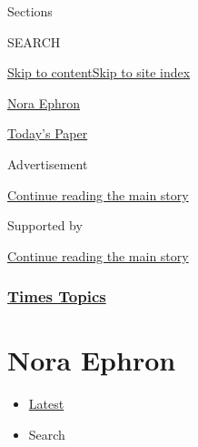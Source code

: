 Sections

SEARCH

\protect\hyperlink{site-content}{Skip to
content}\protect\hyperlink{site-index}{Skip to site index}

\href{https://www.nytimes.com/topic/person/nora-ephron}{Nora Ephron}

\href{https://myaccount.nytimes.com/auth/login?response_type=cookie\&client_id=vi}{}

\href{https://www.nytimes.com/section/todayspaper}{Today's Paper}

Advertisement

\protect\hyperlink{after-top}{Continue reading the main story}

Supported by

\protect\hyperlink{after-sponsor}{Continue reading the main story}

\hypertarget{times-topics}{%
\subsubsection{\texorpdfstring{\href{/index.html}{Times
Topics}}{Times Topics}}\label{times-topics}}

\hypertarget{nora-ephron}{%
\section{Nora Ephron}\label{nora-ephron}}

\begin{itemize}
\tightlist
\item
  \protect\hyperlink{stream-panel}{Latest}
\item
  Search
\end{itemize}

